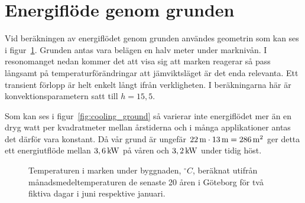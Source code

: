 \section{Energiflöde genom grunden}

% 
% 

Vid beräkningen av energiflödet genom grunden användes geometrin som kan ses i figur~\ref{fig:groundheat}. Grunden antas vara belägen en halv meter under marknivån. I resonomanget nedan kommer det att visa sig att marken reagerar så pass långsamt på temperaturförändringar att jämviktsläget är det enda relevanta. Ett transient förlopp är helt enkelt långt ifrån verkligheten. I beräkningarna här är konvektionsparametern satt till $h=15,5$.

Som kan ses i figur~\ref{fig:cooling_ground} så varierar inte energiflödet mer än en dryg watt per kvadratmeter mellan årstiderna och i många applikationer antas det därför vara konstant. Då vår grund är ungefär $\unit[22]{m}\cdot\unit[13]{m}=\unit[286]{m^2}$ ger detta ett energiutflöde mellan $\unit[3,6]{kW}$ på våren och $\unit[3,2]{kW}$ under tidig höst. 

\begin{figure}
\centering
{}
\caption{\label{fig:groundheat}
Temperaturen i marken under byggnaden, $\unit{^\circ C}$, beräknat utifrån månadsmedeltemperaturen de senaste 20 åren i Göteborg för två fiktiva dagar i juni respektive januari. }
\end{figure}


